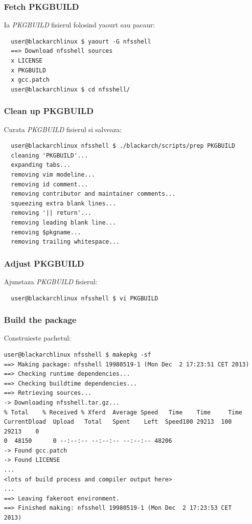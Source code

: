 \documentclass[a4paper, oneside, 11pt]{book}
\begin{document}
\subsubsection{Fetch PKGBUILD}
Ia \textit{PKGBUILD} fisierul folosind yaourt sau pacaur:
\begin{lstlisting}
  user@blackarchlinux $ yaourt -G nfsshell
  ==> Download nfsshell sources
  x LICENSE
  x PKGBUILD
  x gcc.patch
  user@blackarchlinux $ cd nfsshell/
\end{lstlisting}

\subsubsection{Clean up PKGBUILD}
Curata \textit{PKGBUILD} fisierul si salveaza:
\begin{lstlisting}
  user@blackarchlinux nfsshell $ ./blackarch/scripts/prep PKGBUILD
  cleaning 'PKGBUILD'...
  expanding tabs...
  removing vim modeline...
  removing id comment...
  removing contributor and maintainer comments...
  squeezing extra blank lines...
  removing '|| return'...
  removing leading blank line...
  removing $pkgname...
  removing trailing whitespace...
\end{lstlisting}

\subsubsection{Adjust PKGBUILD}
Ajunstaza \textit{PKGBUILD} fisierul:
\begin{lstlisting}
  user@blackarchlinux nfsshell $ vi PKGBUILD
\end{lstlisting}

\subsubsection{Build the package}
Construieste pachetul:
\begin{lstlisting}user@blackarchlinux nfsshell $ makepkg -sf
==> Making package: nfsshell 19980519-1 (Mon Dec  2 17:23:51 CET 2013)
==> Checking runtime dependencies...
==> Checking buildtime dependencies...
==> Retrieving sources...
-> Downloading nfsshell.tar.gz...
% Total    % Received % Xferd  Average Speed   Time    Time     Time
CurrentDload  Upload   Total   Spent    Left  Speed100 29213  100 29213    0
0  48150      0 --:--:-- --:--:-- --:--:-- 48206
-> Found gcc.patch
-> Found LICENSE
...
<lots of build process and compiler output here>
...
==> Leaving fakeroot environment.
==> Finished making: nfsshell 19980519-1 (Mon Dec  2 17:23:53 CET 2013)
\end{lstlisting}
\end{document}
